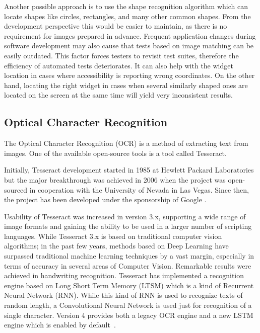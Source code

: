 Another possible approach is to use the shape recognition algorithm which can locate shapes like circles, rectangles, and many other common shapes. From the development perspective this would be easier to maintain, as there is no requirement for images prepared in advance. Frequent application changes during software development may also cause that tests based on image matching can be easily outdated. This factor forces testers to revisit test suites, therefore the efficiency of automated tests deteriorates. It can also help with the widget location in cases where accessibility is reporting wrong coordinates. On the other hand, locating the right widget in cases when several similarly shaped ones are located on the screen at the same time will yield very inconsistent results.

\subsection{Optical Character Recognition}\label{OCR_section}
The Optical Character Recognition (OCR) is a method of extracting text from images. One of the available open-source tools is a tool called Tesseract.

Initially, Tesseract development started in 1985 at Hewlett Packard Laboratories but the major breakthrough was achieved in 2006 when the project was open-sourced in cooperation with the University of Nevada in Las Vegas. Since then, the project has been developed under the sponsorship of Google \cite{tesseract_history}.

Usability of Tesseract was increased in version 3.x, supporting a wide range of image formats and gaining the ability to be used in a larger number of scripting languages. While Tesseract 3.x is based on traditional computer vision algorithms; in the past few years, methods based on Deep Learning have surpassed traditional machine learning techniques by a vast margin, especially in terms of accuracy in several areas of Computer Vision. Remarkable results were achieved in handwriting recognition. Tesseract has implemented a recognition engine based on Long Short Term Memory (LTSM) which is a kind of Recurrent Neural Network (RNN). While this kind of RNN is used to recognize texts of random length, a Convolutional Neural Network is used just for recognition of a single character. Version 4 provides both a legacy OCR engine and a new LSTM engine which is enabled by default~\cite{tesseract}. 

